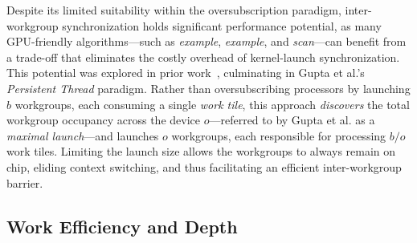 \documentclass[sigconf]{acmart}
\begin{document}
Despite its limited suitability within the oversubscription paradigm, inter-workgroup synchronization holds significant performance potential, as many GPU-friendly algorithms—such as \emph{example}, \emph{example}, and \emph{scan}---can benefit from a trade-off that eliminates the costly overhead of kernel-launch synchronization. This potential was explored in prior work~\cite{}, culminating in Gupta et al.’s~\cite{} \emph{Persistent Thread} paradigm. Rather than oversubscribing processors by launching $b$ workgroups, each consuming a single \emph{work tile}, this approach \emph{discovers} the total workgroup occupancy across the device $o$---referred to by Gupta et al. as a \emph{maximal launch}---and launches $o$ workgroups, each responsible for processing $b/o$ work tiles. Limiting the launch size allows the workgroups to always remain on chip, eliding context switching, and thus facilitating an efficient inter-workgroup barrier.

\subsection{Work Efficiency and Depth}
\end{document}
